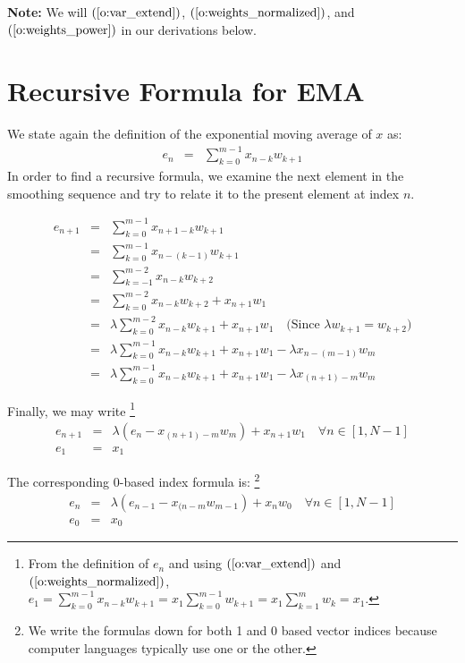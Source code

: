 \documentclass{article}
\begin{document}
{\bf Note:\/} We will $(\ref{o:var_extend})$, $(\ref{o:weights_normalized})$,
and $(\ref{o:weights_power})$ in our derivations below.

\section{Recursive Formula for EMA}
We state again the definition of the exponential moving average of $x$ as:
\begin{eqnarray}
    e_n &=& \sum_{k=0}^{m-1} x_{n-k} w_{k+1} 
\end{eqnarray}
In order to find a recursive formula, we examine the next element in the smoothing sequence 
and try to relate it to the present element at index $n$.

\begin{eqnarray*}
    e_{n+1} &=&  \sum_{k=0}^{m-1} x_{n+1-k} w_{k+1} \\
        &=&  \sum_{k=0}^{m-1} x_{n-(k-1)} w_{k+1} \\
        &=&  \sum_{k=-1}^{m-2} x_{n-k} w_{k+2}  \\
        &=&  \sum_{k=0}^{m-2} x_{n-k} w_{k+2}  + x_{n+1} w_1 \\
        &=&  \lambda \sum_{k=0}^{m-2} x_{n-k} w_{k+1}  + x_{n+1} w_1  \quad \text{(Since $\lambda w_{k+1} = w_{k+2}$)} \\
        &=&  \lambda \sum_{k=0}^{m-1} x_{n-k} w_{k+1}  + x_{n+1} w_1  
                - \lambda x_{n-(m-1)} w_m  \\
        &=&  \lambda \sum_{k=0}^{m-1} x_{n-k} w_{k+1}  + x_{n+1} w_1  
                - \lambda x_{(n+1)-m} w_m  
\end{eqnarray*}

Finally, we may write%
\footnote{From the definition of $e_n$ and using 
$(\ref{o:var_extend})$ and $(\ref{o:weights_normalized})$,
$e_1 = \sum_{k=0}^{m-1} x_{n-k} w_{k+1} = x_1 \sum_{k=0}^{m-1} w_{k+1} = x_1 \sum_{k=1}^m w_k = x_1$.}
\begin{eqnarray}
    e_{n+1} &=&  \lambda \left(e_n - x_{(n+1) - m} w_m \right) + x_{n+1} w_1  \quad \forall n \in [1, N-1] \\
    e_1     &=&  x_1 
\end{eqnarray}

The corresponding 0-based index formula is:%
\footnote{We write the formulas down for both 1 and  0 based vector indices because
computer languages typically use one or the other.}
\begin{eqnarray}
    e_{n} &=&  \lambda \left( e_{n-1} - x_{(n-m} w_{m-1} \right) + x_{n} w_0  \quad \forall n \in [1, N-1] \\
    e_0   &=&  x_0 
\end{eqnarray}
\end{document}

